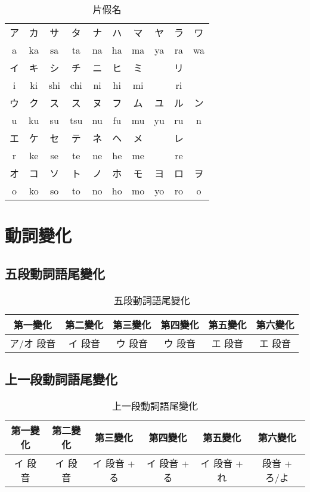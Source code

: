 \documentclass[12pt]{article}
\begin{document}
\begin{CJK}{UTF8}{cybercjk}
\begin{table}[htdp]
\caption{片假名}
\begin{tabular}{cccccccccc}
\hline
ア& カ & サ & タ & ナ & ハ & マ & ヤ & ラ & ワ\\
a & ka & sa & ta & na & ha & ma& ya & ra & wa\\
\hline
イ& キ & シ & チ & ニ & ヒ & ミ &  & リ & \\
i & ki & shi & chi & ni & hi & mi & & ri& \\
\hline
ウ& ク & ス & ス & ヌ & フ & ム & ユ & ル & ン\\
 u & ku &  su &  tsu &  nu &  fu &  mu &  yu &  ru & n\\	
\hline
エ& ケ & セ & テ & ネ & ヘ & メ & & レ & \\
 r & ke &  se &  te &  ne &  he &  me & &  re & \\	
\hline
オ& コ & ソ & ト & ノ & ホ & モ & ヨ & ロ & ヲ\\
 o &  ko &  so &  to &  no &  ho &  mo &  yo &  ro & o\\	

\hline
\end{tabular}
\end{table}

\section{動詞變化}

\subsection{五段動詞語尾變化}

\begin{table}[htdp]
{\scriptsize
\begin{tabular}{cccccc}
\hline
第一變化 & 第二變化 & 第三變化 & 第四變化 & 第五變化 & 第六變化 \\
\hline
ア/オ 段音 & イ 段音 & ウ 段音 & ウ 段音  & エ 段音 & エ 段音  \\
\hline
\end{tabular}
\caption{五段動詞語尾變化}
}
\end{table}

\subsection{上一段動詞語尾變化}
\begin{table}[htdp]
{\scriptsize
\begin{tabular}{cccccc}
\hline
第一變化 & 第二變化 & 第三變化 & 第四變化 & 第五變化 & 第六變化 \\
\hline
イ 段音 & イ 段音 & イ 段音 + る &  イ 段音 + る &  イ 段音 + れ &  段音 + ろ/よ \\
\hline
\end{tabular}
\caption{上一段動詞語尾變化}
}
\end{table}


\end{CJK}
\end{document}
